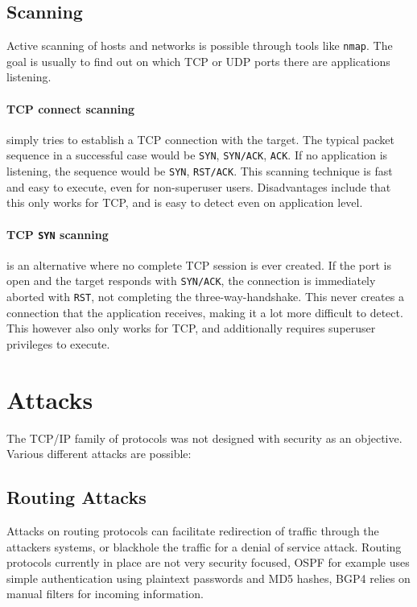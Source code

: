 \subsection{Scanning}
Active scanning of hosts and networks is possible through tools like
\texttt{nmap}. The goal is usually to find out on which TCP or UDP ports there
are applications listening.

\paragraph{TCP connect scanning} simply tries to establish a TCP connection with
the target. The typical packet sequence in a successful case would be
\texttt{SYN}, \texttt{SYN/ACK}, \texttt{ACK}. If no application is listening,
the sequence would be \texttt{SYN}, \texttt{RST/ACK}. This scanning technique is
fast and easy to execute, even for non-superuser users. Disadvantages include
that this only works for TCP, and is easy to detect even on application level.

\paragraph{TCP \texttt{SYN} scanning} is an alternative where no complete TCP
session is ever created. If the port is open and the target responds with
\texttt{SYN/ACK}, the connection is immediately aborted with \texttt{RST}, not
completing the three-way-handshake. This never creates a connection that the
application receives, making it a lot more difficult to detect. This however
also only works for TCP, and additionally requires superuser privileges to
execute.

\section{Attacks}
The TCP/IP family of protocols was not designed with security as an objective.
Various different attacks are possible:

\subsection{Routing Attacks}
Attacks on routing protocols can facilitate redirection of traffic through the
attackers systems, or blackhole the traffic for a denial of service attack.
Routing protocols currently in place are not very security focused, OSPF for
example uses simple authentication using plaintext passwords and MD5 hashes,
BGP4 relies on manual filters for incoming information.

